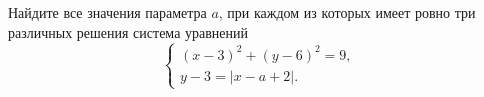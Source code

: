 \begin{ex}
	\begin{condition}
		Найдите все значения параметра \( a \), при каждом из которых имеет ровно три различных решения система уравнений
		\[ \left\{
		\begin{array}{l}
			(x-3)^2+(y-6)^2=9,\\
			y-3=|x-a+2|.
		\end{array}
		\right. \]
	\end{condition}
\end{ex}